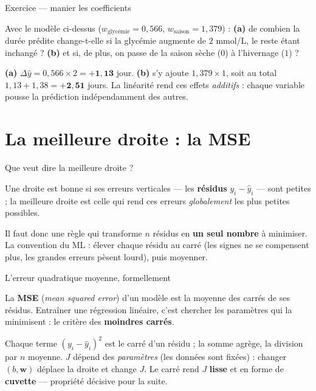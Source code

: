 \documentclass[aspectratio=169,11pt]{beamer}
\begin{document}
\begin{frame}{Exercice — manier les coefficients}
\begin{ucadrec}[Énoncé]
{\small Avec le modèle ci-dessus ($w_{\text{glycémie}} = 0{,}566$, $w_{\text{saison}} = 1{,}379$) : \textbf{(a)} de combien la durée prédite change-t-elle si la glycémie augmente de $2$ mmol/L, le reste étant inchangé ? \textbf{(b)} et si, de plus, on passe de la saison sèche ($0$) à l'hivernage ($1$) ?}
\end{ucadrec}
\pause
\begin{ucadex}[Correction]
{\small \textbf{(a)} $\Delta\hat y = 0{,}566 \times 2 = \mathbf{+1{,}13}$ jour. \textbf{(b)} s'y ajoute $1{,}379 \times 1$, soit au total $1{,}13 + 1{,}38 = \mathbf{+2{,}51}$ jours. La linéarité rend ces effets \emph{additifs} : chaque variable pousse la prédiction indépendamment des autres.}
\end{ucadex}
\end{frame}

\section[La meilleure droite]{La meilleure droite : la MSE}

\begin{frame}{Que veut dire la meilleure droite ?}
\begin{ucaddef}
{\small Une droite est bonne si ses erreurs verticales — les \textbf{résidus} $y_i - \hat y_i$ — sont petites ; la meilleure droite est celle qui rend ces erreurs \emph{globalement} les plus petites possibles.}
\end{ucaddef}
{\small Il faut donc une règle qui transforme $n$ résidus en \textbf{un seul nombre} à minimiser. La convention du ML : élever chaque résidu au carré (les signes ne se compensent plus, les grandes erreurs pèsent lourd), puis moyenner.}
\end{frame}

\begin{frame}{L'erreur quadratique moyenne, formellement}
\begin{ucaddef}[Définition]
{\small La \textbf{MSE} (\emph{mean squared error}) d'un modèle est la moyenne des carrés de ses résidus. Entraîner une régression linéaire, c'est chercher les paramètres qui la minimisent : le critère des \textbf{moindres carrés}.}
\end{ucaddef}
{\small Chaque terme $(y_i - \hat y_i)^2$ est le carré d'un résidu ; la somme agrège, la division par $n$ moyenne. $J$ dépend des \emph{paramètres} (les données sont fixées) : changer $(b,\mathbf{w})$ déplace la droite et change $J$. Le carré rend $J$ \textbf{lisse} et en forme de \textbf{cuvette} — propriété décisive pour la suite.}
\end{frame}
\end{document}
